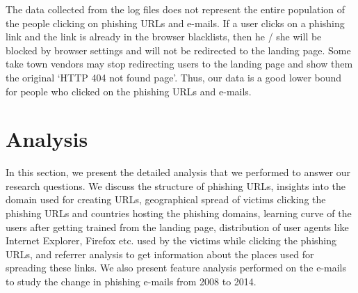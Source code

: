 \documentclass[conference]{IEEEtran}
\begin{document}
\newline\indent
The data collected from the log files does not represent the entire population of the people clicking on phishing URLs and e-mails. If a user clicks on a phishing link and the link is already in the browser blacklists, then he / she will be blocked by browser settings and will not be redirected to the landing page. Some take town vendors may stop redirecting users to the landing page and show them the original `HTTP 404 not found page'. Thus, our data is a good lower bound for people who clicked on the phishing URLs and e-mails.

\section{Analysis}
In this section, we present the detailed analysis that we performed to answer our research questions. We discuss the structure of phishing URLs, insights into the domain used for creating URLs, geographical spread of victims clicking the phishing URLs and countries hosting the phishing domains, learning curve of the users after getting trained from the landing page, distribution of user agents like Internet Explorer, Firefox etc. used by the victims while clicking the phishing URLs, and referrer analysis to get information about the places used for spreading these links. We also present feature analysis performed on the e-mails to study the change in phishing e-mails from 2008 to 2014.
\end{document}
